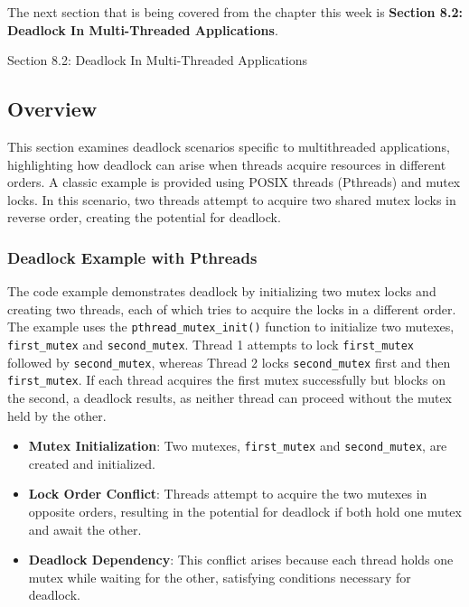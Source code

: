 The next section that is being covered from the chapter this week is \textbf{Section 8.2: Deadlock In Multi-Threaded Applications}.

\begin{notes}{Section 8.2: Deadlock In Multi-Threaded Applications}
    \subsection*{Overview}

    This section examines deadlock scenarios specific to multithreaded applications, highlighting how deadlock can arise when threads acquire resources in different orders. A classic example is provided 
    using POSIX threads (Pthreads) and mutex locks. In this scenario, two threads attempt to acquire two shared mutex locks in reverse order, creating the potential for deadlock.
    
    \subsubsection*{Deadlock Example with Pthreads}
    
    The code example demonstrates deadlock by initializing two mutex locks and creating two threads, each of which tries to acquire the locks in a different order. The example uses the \texttt{pthread\_mutex\_init()} 
    function to initialize two mutexes, \texttt{first\_mutex} and \texttt{second\_mutex}. Thread 1 attempts to lock \texttt{first\_mutex} followed by \texttt{second\_mutex}, whereas Thread 2 locks \texttt{second\_mutex} 
    first and then \texttt{first\_mutex}. If each thread acquires the first mutex successfully but blocks on the second, a deadlock results, as neither thread can proceed without the mutex held by the other.
    
    \begin{highlight}
    
        \begin{itemize}
            \item \textbf{Mutex Initialization}: Two mutexes, \texttt{first\_mutex} and \texttt{second\_mutex}, are created and initialized.
            \item \textbf{Lock Order Conflict}: Threads attempt to acquire the two mutexes in opposite orders, resulting in the potential for deadlock if both hold one mutex and await the other.
            \item \textbf{Deadlock Dependency}: This conflict arises because each thread holds one mutex while waiting for the other, satisfying conditions necessary for deadlock.
        \end{itemize}
    

\end{highlight}
\end{notes}

